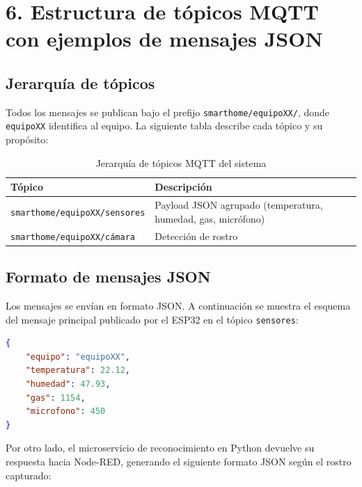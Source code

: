 \documentclass[12pt, a4paper]{report}
\begin{document}
\chapter*{6. Estructura de tópicos MQTT con ejemplos de mensajes JSON}

\section*{Jerarquía de tópicos}

Todos los mensajes se publican bajo el prefijo \texttt{smarthome/equipoXX/}, donde \texttt{equipoXX} identifica al equipo. La siguiente tabla describe cada tópico y su propósito:

\begin{table}[H]
  \centering
  \caption{Jerarquía de tópicos MQTT del sistema}
  \begin{tabular}{p{5.5cm} p{8cm}}
    \toprule
    \textbf{Tópico} & \textbf{Descripción} \\
    \midrule
    \texttt{smarthome/equipoXX/sensores} & Payload JSON agrupado (temperatura, humedad, gas, micrófono) \\[4pt]
    \texttt{smarthome/equipoXX/cámara}   & Detección de rostro \\
    \bottomrule
  \end{tabular}
  \label{tab:topicos}
\end{table}

\section*{Formato de mensajes JSON}

Los mensajes se envían en formato JSON. A continuación se muestra el esquema del mensaje principal publicado por el ESP32 en el tópico \texttt{sensores}:

\begin{lstlisting}[language=json, caption={Mensaje JSON publicado por el nodo de sensores}]
{
    "equipo": "equipoXX",
    "temperatura": 22.12,
    "humedad": 47.93,
    "gas": 1154,
    "microfono": 450
}
\end{lstlisting}

Por otro lado, el microservicio de reconocimiento en Python devuelve su respuesta hacia Node-RED, generando el siguiente formato JSON según el rostro capturado:
\end{document}
